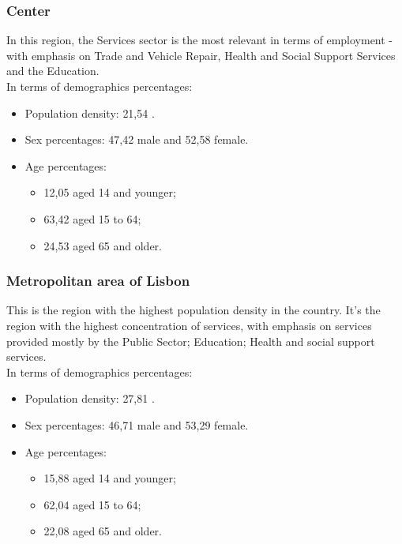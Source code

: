 \subsubsection{Center}
In this region, the Services sector is the most relevant in terms of employment - with emphasis on Trade and Vehicle Repair, Health and Social Support Services and the Education. \\
In terms of demographics percentages:
    \begin{itemize}
        \item Population density: {21,54\textdiscount} . 
        \item Sex percentages: {47,42\textdiscount} male and {52,58\textdiscount} female.
        \item Age percentages: 
        \begin{itemize}
        \item {12,05 \textdiscount} aged 14 and younger;
        \item {63,42\textdiscount} aged 15 to 64;
        \item {24,53\textdiscount} aged 65 and older.
        \end{itemize}
    \end{itemize}
    
\subsubsection{Metropolitan area of Lisbon }
This is the region with the highest population density in the country. It's the region with the highest concentration of services, with emphasis on services provided mostly by the Public Sector; Education; Health and social support services.\\
In terms of demographics percentages:
    \begin{itemize}
        \item Population density: {27,81\textdiscount} . 
        \item Sex percentages: {46,71\textdiscount} male and {53,29\textdiscount} female.
        \item Age percentages: 
        \begin{itemize}
        \item {15,88 \textdiscount} aged 14 and younger;
        \item {62,04\textdiscount} aged 15 to 64;
        \item {22,08\textdiscount} aged 65 and older.
        \end{itemize}
    \end{itemize}
    
